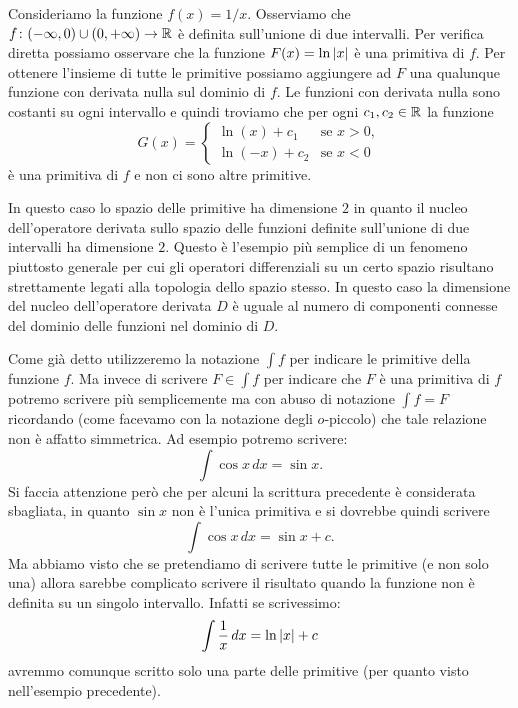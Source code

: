 \begin{example}
\mymark{*}
Consideriamo la funzione $f(x) = 1/x$. Osserviamo che
$f\colon (-\infty, 0) \cup (0,+\infty)\to \mathbb R$ è definita sull'unione di due
intervalli. Per verifica diretta possiamo osservare che la funzione
$F(x) = \ln {\left|x\right|}$ è una primitiva di $f$. Per ottenere l'insieme di tutte
le primitive possiamo aggiungere ad $F$ una qualunque funzione con derivata
nulla sul dominio di $f$. Le funzioni con derivata nulla sono costanti su ogni
intervallo e quindi troviamo che per ogni $c_1, c_2\in \mathbb R$ la funzione
\[
G(x) =
\begin{cases}
  \ln (x) + c_1 &\text{se $x>0$},\\
  \ln (-x) + c_2 & \text{se $x<0$}
\end{cases}
\]
è una primitiva di $f$ e non ci sono altre primitive.

In questo caso lo spazio delle primitive ha dimensione $2$ in quanto il nucleo
dell'operatore derivata sullo spazio delle funzioni definite sull'unione di
due intervalli ha dimensione $2$.
Questo è l'esempio più semplice di un fenomeno piuttosto generale per cui gli
operatori differenziali su un certo spazio risultano strettamente legati alla
topologia dello spazio stesso. In questo caso la dimensione del nucleo
dell'operatore derivata $D$ è uguale al numero di componenti connesse del
dominio delle funzioni nel dominio di $D$.
\end{example}

Come già detto utilizzeremo la notazione $\int f$ per indicare le primitive
della funzione $f$.
Ma invece di scrivere $F\in \int f$
per indicare che $F$ è una primitiva di $f$
potremo scrivere
più semplicemente ma con abuso di notazione $\int f = F$
ricordando (come facevamo con la notazione degli $o$-piccolo) che tale relazione
non è affatto simmetrica.
Ad esempio potremo scrivere:
\[
  \int \cos x\, dx = \sin x.
\]
Si faccia attenzione però che per alcuni la scrittura precedente
è considerata sbagliata, in quanto $\sin x$ non è l'unica primitiva e si dovrebbe
quindi scrivere
\[
  \int \cos x\, dx = \sin x + c.
\]
Ma abbiamo visto che se pretendiamo di scrivere tutte le primitive (e non solo una)
allora sarebbe complicato scrivere il risultato quando la funzione non è definita
su un singolo intervallo. Infatti se scrivessimo:
\[
  \int \frac 1 x\, dx = \ln {\left|x\right|} + c
\]
avremmo comunque scritto solo una parte delle primitive (per quanto visto nell'esempio
precedente).

